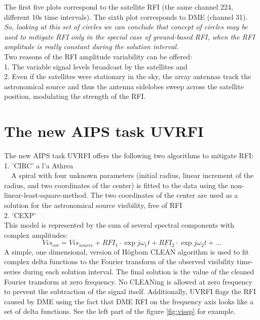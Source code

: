 \documentclass{article}
\begin{document}
The first five plots correspond to the satellite RFI (the same channel
224, different 10s time intervals). The sixth plot corresponds to
DME (channel 31). {\em So, looking at this set of circles we can
  conclude that concept of circles may be used to mitigate RFI only in
  the special case of ground-based RFI, when the RFI amplitude is
  really constant during the solution interval.}\\
Two reasons of the RFI amplitude variability can be offered: \\
1. The variable signal levels broadcast by the satellites and \\
2. Even if the satellites were stationary in the sky, the array
antennas track the astronomical source and thus the antenna sidelobes
sweep across the satellite position, modulating the strength of the RFI.


\section{The new AIPS task UVRFI}
The new AIPS task UVRFI offers the following two algorithms to mitigate RFI: \\
1. 'CIRC' a l'a Athrea\\
~~A spiral with four unknown parameters (initial radius, linear
increment of the radius, and  two coordinates of the center) is fitted to
the data using the non-linear-least-square-method. The two coordinates of
the center are used as a solution for the astronomical source
visibility, free of RFI\\
2. 'CEXP'\\
This model is represented by the sum of several spectral components
with complex amplitudes:
\begin{equation}
        Vis_{cor} = Vis_{source} + RFI_{1} \cdot \exp j \omega_{1} t + RFI_{2} \cdot \exp j \omega_{2} t +...
        \label{eq:cexp}
\end{equation}
A simple, one dimensional, version of  H\"{o}gbom CLEAN algorithm is
used to fit complex delta functions to the Fourier transform of the
observed visibility time-series during each solution interval. The
final solution is the value of the cleaned Fourier transform at zero
frequency. No CLEANing is allowed at zero frequency to prevent the
subtraction of the signal itself.
Additionally, UVRFI flags the RFI caused by DME using the fact
that DME RFI on the frequency axis looks like a set of delta
functions. See the left part of  the figure \ref{fig:vissp} for example.
\end{document}
